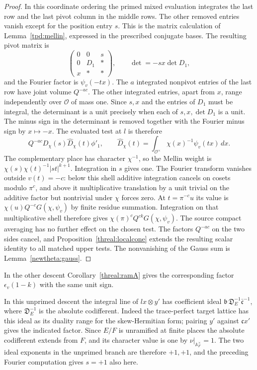 \begin{proof}
In this coordinate ordering the primed mixed evaluation integrates
the last row and the last pivot column in the middle rows. The
other removed entries vanish except for the position entry \(s\).
This is the matrix calculation of Lemma~\ref{tpd:mellin}, expressed
in the prescribed conjugate bases. The resulting pivot matrix is
\[
     \begin{pmatrix}0&0&s\\0&D_1&*\\ x&*&*\end{pmatrix},
       \qquad \det=-sx\det D_1 ,
\]
and the Fourier factor is \(\psi_v(-tx)\). The \(a\) integrated
nonpivot entries of the last row have joint volume \(Q^{-ac}\).
The other integrated entries, apart from \(x\), range independently
over \(\mathcal O\) of mass one. Since \(s,x\) and the entries
of \(D_1\) must be integral, the determinant is a unit precisely
when each of \(s,x,\det D_1\) is a unit. The minus sign in the
determinant is removed together with the Fourier minus sign by
\(x\mapsto-x\). The evaluated test at \(l\) is therefore
\[
 Q^{-ac}D_\chi(s)\widehat D_\chi(t)\phi'_1,\qquad
 \widehat D_\chi(t)=
       \int_{\mathcal O^\times}\chi(x)^{-1}\psi_v(tx)\,dx .
\]
The complementary place has character \(\chi^{-1}\), so the Mellin
weight is \(\chi(s)\chi(t)^{-1}|st|^{k+1}\).
Integration in \(s\) gives one. The Fourier transform vanishes
outside \(v(t)=-c\): below this shell additive integration
cancels on cosets modulo \(\pi^c\), and above it multiplicative
translation by a unit trivial on the additive factor but
nontrivial under \(\chi\) forces zero. At \(t=\pi^{-c}u\) its
value is \(\chi(u)Q^{-c}G(\chi,\psi_v)\) by finite residue
summation. Integration on that multiplicative shell therefore
gives \(\chi(\pi)^c Q^{ck}G(\chi,\psi_v)\).
The source compact averaging has no further effect on the chosen
test. The factors \(Q^{-ac}\) on the two sides cancel, and
Proposition~\ref{threal:localcone} extends the resulting scalar
identity to all matched upper tests. The nonvanishing of the
Gauss sum is Lemma~\ref{newtheta:gauss}.
\end{proof}

In the other descent Corollary~\ref{threal:ramA} gives the
corresponding factor \(\epsilon_v(1-k)\) with the same unit sign.

In this unprimed descent the integral line of \(l x\otimes y'\)
has coefficient ideal
\(\mathfrak b\,\mathfrak D_E^{-1}\bar{\mathfrak c}^{-1}\),
where \(\mathfrak D_E^{-1}\) is the absolute codifferent. Indeed
the trace-perfect target lattice has this ideal as its duality
range for the skew-Hermitian form; pairing \(y'\) against
\(\mathfrak c x'\) gives the indicated factor. Since \(E/F\)
is unramified at finite places the absolute codifferent extends
from \(F\), and its character value is one by
\(\nu|_{\mathbb A_F^\times}=1\). The two ideal exponents in the
unprimed branch are therefore \(+1,+1\), and the preceding
Fourier computation gives \(s=+1\) also here.

